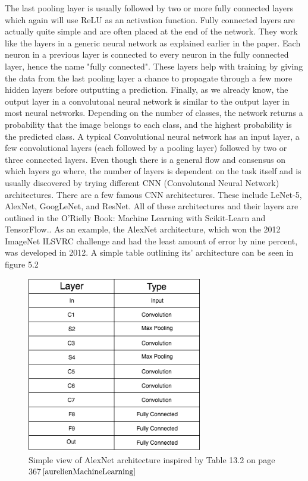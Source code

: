 \documentclass[12pt]{report} %
\begin{document}
	The last pooling layer is usually followed by two or more fully connected layers which again will use ReLU as an activation function. Fully connected layers are actually quite simple and are often placed at the end of the network. They work like the layers in a generic neural network as explained earlier in the paper. Each neuron in a previous layer is connected to every neuron in the fully connected layer, hence the name "fully connected"\cite{LeonardoFully}. These layers help with training by giving the data from the last pooling layer a chance to propagate through a few more hidden layers before outputting a prediction. 
	Finally, as we already know, the output layer in a convolutonal neural network is similar to the output layer in most neural networks. Depending on the number of classes, the network returns a probability that the image belongs to each class, and the highest probability is the predicted class. 
	A typical Convolutional neural network has an input layer, a few convolutional layers (each followed by a pooling layer) followed by two or three connected layers. Even though there is a general flow and consensus on which layers go where, the number of layers is dependent on the task itself and is usually discovered by trying different CNN (Convolutonal Neural Network) architectures.
	There are a few famous CNN architectures. These include LeNet-5, AlexNet, GoogLeNet, and ResNet. All of these architectures and their layers are outlined in the O'Rielly Book: Machine Learning with Scikit-Learn and TensorFlow.\cite{aurelienMachineLearning}. As an example, the AlexNet architecture, which won the 2012 ImageNet ILSVRC challenge and had the least amount of error by nine percent, was developed in 2012. A simple table outlining its' architecture can be seen in figure 5.2
\begin{figure}
\centering
\includegraphics[width=3in]{alex_net_arch}
\caption{Simple view of AlexNet architecture inspired by Table 13.2 on page 367$\cite{aurelienMachineLearning}$}
\end{figure}		
\end{document}
